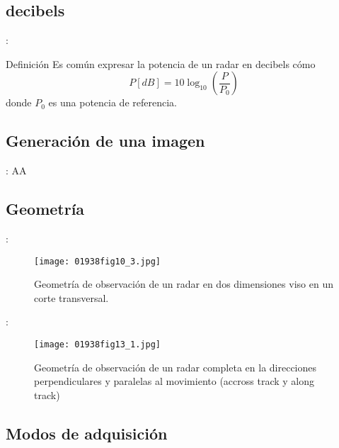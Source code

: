 \subsection{decibels}
\begin{frame}{\secname : \subsecname}
    \begin{block}{Definición}
      Es común expresar la potencia de un radar en decibels cómo
      \begin{equation}
        P [dB] = 10\log_{10}\left( \frac{P}{P_0}\right)
      \end{equation}
      donde $P_0$ es una potencia de referencia.
    \end{block}
\end{frame}

\subsection{Generación de una imagen}
\begin{frame}{\secname : \subsecname}
    AA
\end{frame}

\subsection{Geometría}
\begin{frame}{\secname : \subsecname}
  \begin{figure}
    \centering
    \texttt{[image: 01938fig10\_3.jpg]}
    \caption{Geometría de observación de un radar en dos dimensiones viso en un corte transversal.}
    \label{}
  \end{figure}
\end{frame}

\begin{frame}{\secname : \subsecname}
  \begin{figure}
    \centering
    \texttt{[image: 01938fig13\_1.jpg]}
    \caption{Geometría de observación de un radar completa en la direcciones perpendiculares y paralelas al movimiento (accross track y along track)}
    \label{}
  \end{figure}
\end{frame}

\subsection{Modos de adquisición}

